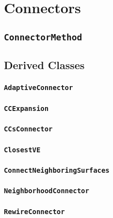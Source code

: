 \chapter{Connectors}

\section{\texttt{ConnectorMethod}}

\section{Derived Classes}

\subsection{\texttt{AdaptiveConnector}}

\subsection{\texttt{CCExpansion}}

\subsection{\texttt{CCsConnector}}

\subsection{\texttt{ClosestVE}}

\subsection{\texttt{ConnectNeighboringSurfaces}}

\subsection{\texttt{NeighborhoodConnector}}

\subsection{\texttt{RewireConnector}}


